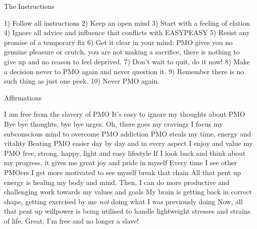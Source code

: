 The Instructions

1) Follow all instructions
2) Keep an open mind
3) Start with a feeling of elation
4) Ignore all advice and influence that conflicts with EASYPEASY
5) Resist any promise of a temporary fix
6) Get it clear in your mind: PMO gives you no genuine pleasure or crutch, you are not making a sacrifice, there is nothing to give up and no reason to feel deprived.
7) Don't wait to quit, do it now!
8) Make a decision never to PMO again and never question it.
9) Remember there is no such thing as just one peek.
10) Never PMO again.

Affirmations

I am free from the slavery of PMO
It's easy to ignore my thoughts about PMO
Bye bye thoughts, bye bye urges. Oh, there goes my cravings
I focus my subconscious mind to overcome PMO addiction
PMO steals my time, energy and vitality
Beating PMO easier day by day and in every aspect
I enjoy and value my PMO free, strong, happy, light and easy lifestyle
If I look back and think about my progress, it gives me great joy and pride in myself
Every time I see other PMOers I get more motivated to see myself break that chain
All that pent up energy is healing my body and mind. Then, I can do more productive and challenging work towards my values and goals
My brain is getting back in correct shape, getting exercised by me \textit{not} doing what I was previously doing
Now, all that pent up willpower is being utilised to handle lightweight stresses and strains of life.
Great, I'm free and no longer a slave!
